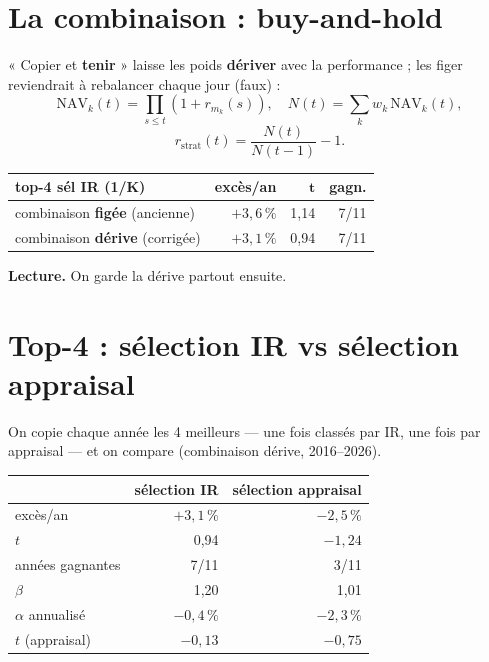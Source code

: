 \documentclass[10pt,a4paper,twocolumn]{article}
\begin{document}
\section{La combinaison : buy-and-hold}
« Copier et \textbf{tenir} » laisse les poids \textbf{dériver} avec la performance ; les figer reviendrait
à rebalancer chaque jour (faux) :
$$\mathrm{NAV}_k(t)=\!\prod_{s\le t}\!(1+r_{m_k}(s)),\quad N(t)=\sum_k w_k\,\mathrm{NAV}_k(t),$$
$$r_{\text{strat}}(t)=\frac{N(t)}{N(t-1)}-1.$$

\begin{center}\small\setlength{\tabcolsep}{5pt}
\begin{tabular}{lrrr}
\toprule
\textbf{top-4 sél IR (1/K)} & \textbf{excès/an} & $\boldsymbol{t}$ & \textbf{gagn.}\\
\midrule
combinaison \textbf{figée} (ancienne)   & $+3{,}6\,\%$ & 1,14 & 7/11\\
combinaison \textbf{dérive} (corrigée) & $+3{,}1\,\%$ & 0,94 & 7/11\\
\bottomrule
\end{tabular}
\end{center}

\textbf{Lecture.} On garde la dérive partout ensuite.

\section{Top-4 : sélection IR vs sélection appraisal}
On copie chaque année les 4 meilleurs --- une fois classés par IR, une fois par appraisal --- et on compare
(combinaison dérive, 2016--2026).

\begin{center}\small\setlength{\tabcolsep}{6pt}
\begin{tabular}{lrr}
\toprule
 & \textbf{sélection IR} & \textbf{sélection appraisal}\\
\midrule
excès/an          & $+3{,}1\,\%$ & $-2{,}5\,\%$\\
$t$               & 0,94 & $-1{,}24$\\
années gagnantes  & 7/11 & 3/11\\
$\beta$           & 1,20 & 1,01\\
$\alpha$ annualisé & $-0{,}4\,\%$ & $-2{,}3\,\%$\\
$t$ (appraisal)   & $-0{,}13$ & $-0{,}75$\\
\bottomrule
\end{tabular}
\end{center}
\end{document}
